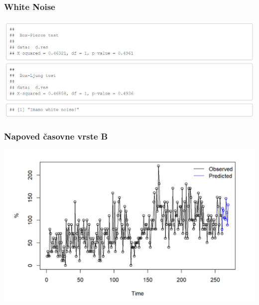 \documentclass[10pt]{beamer}
\begin{document}
\begin{frame}
\frametitle{White Noise}
\includegraphics[width=1\textwidth]{testwnB.png}
\end{frame}



\begin{frame}
\frametitle{Napoved časovne vrste B}
\includegraphics[width=1\textwidth]{napovedB.png}
\end{frame}
\end{document}

